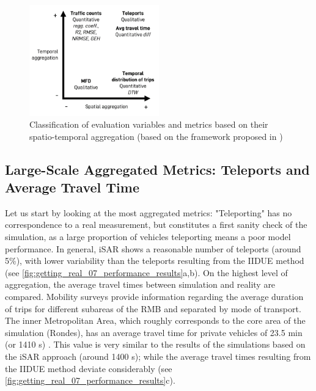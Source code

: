 \begin{figure}[htbp!]
    \centering
    \includegraphics[width=0.5\textwidth]{fig_06.png}
    \caption{Classification of evaluation variables and metrics based on their spatio-temporal aggregation (based on the framework proposed in \citep[Figure 1]{Kang2019})}
   \label{fig:getting_real_06_class_eval_vars}
\end{figure}

\subsection{Large-Scale Aggregated Metrics: Teleports and Average Travel Time}

Let us start by looking at the most aggregated metrics: "Teleporting" has no correspondence to a real measurement, but constitutes a first sanity check of the simulation, as a large proportion of vehicles teleporting means a poor model performance. In general, iSAR shows a reasonable number of teleports (around 5\%), with lower variability than the teleports resulting from the IIDUE method (see \autoref{fig:getting_real_07_performance_results}a,b).
On the highest level of aggregation, the average travel times between simulation and reality are compared. Mobility surveys provide information regarding the average duration of trips for different subareas of the RMB and separated by mode of transport. The inner Metropolitan Area, which roughly corresponds to the core area of the simulation (Rondes), has an average travel time for private vehicles of 23.5 min (or 1410 s) \citep{InstitutdEstudisRegionalsiMetropolitansdeBarcelonaIERMB2020}. This value is very similar to the results of the simulations based on the iSAR approach (around 1400 s); while the average travel times resulting from the IIDUE method deviate considerably (see \autoref{fig:getting_real_07_performance_results}c).

